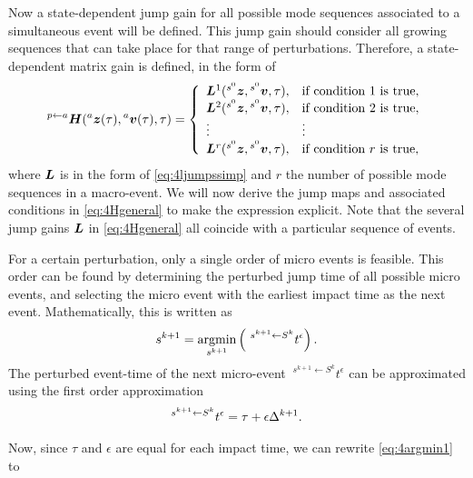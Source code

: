 \documentclass[../DC2017114Bouma.tex]{subfiles}
\begin{document}
Now a state-dependent jump gain for all possible mode sequences associated to a simultaneous event will be defined. This jump gain should consider all growing sequences that can take place for that range of perturbations. Therefore, a state-dependent matrix gain is defined, in the form of
\begin{align}
\hspace{0cm}^{p \leftarrow a}{\boldsymbol{H}}(\hspace{0cm}^{a}{\boldsymbol{z}}(\tau),\hspace{0cm}^{a}{\boldsymbol{v}}(\tau),\tau) = \left\lbrace\begin{array}{ll}
{\boldsymbol{L}}^1(\hspace{0cm}^{s^0}{\boldsymbol{z}},\hspace{0cm}^{s^0}{\boldsymbol{v}},\tau), & \text{if condition 1 is true},\\
{\boldsymbol{L}}^2(\hspace{0cm}^{s^0}{\boldsymbol{z}},\hspace{0cm}^{s^0}{\boldsymbol{v}},\tau), & \text{if condition 2 is true},\\
\vdots & \vdots\\
{\boldsymbol{L}}^{r}(\hspace{0cm}^{s^0}{\boldsymbol{z}},\hspace{0cm}^{s^0}{\boldsymbol{v}},\tau), & \text{if condition }r\text{ is true},
\end{array}\right.\label{eq:4Hgeneral}
\end{align}
where ${\boldsymbol{L}}$ is in the form of \eqref{eq:4ljumpssimp} and $r$ the number of possible mode sequences in a macro-event. We will now derive the jump maps and associated conditions in \eqref{eq:4Hgeneral} to make the expression explicit. Note that the several jump gains ${\boldsymbol{L}}$ in \eqref{eq:4Hgeneral} all coincide with a particular sequence of events.

For a certain perturbation, only a single order of micro events is feasible. This order can be found by determining the perturbed jump time of all possible micro events, and selecting the micro event with the earliest impact time as the next event. Mathematically, this is written as
\begin{align}
s^{k+1} = \underset{s^{k+1}}{\operatorname{\text{argmin}}}\left(\ ^{s^{k+1} \leftarrow S^{k}}t^\epsilon\right).\label{eq:4argmin1}
\end{align}
The perturbed event-time of the next micro-event $\ ^{s^{k+1} \leftarrow S^{k}}t^\epsilon$ can be approximated using the first order approximation
\begin{align}
\hspace{0cm}^{s^{k+1} \leftarrow S^{k}}t^\epsilon = \tau + \epsilon\Delta^{k+1}.
\end{align}

Now, since $\tau$ and $\epsilon$ are equal for each impact time, we can rewrite \eqref{eq:4argmin1} to
\end{document}
